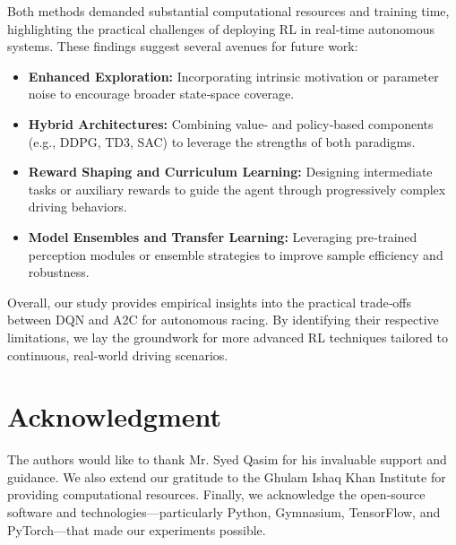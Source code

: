 \documentclass[conference]{IEEEtran}
\begin{document}
Both methods demanded substantial computational resources and training time, highlighting the practical challenges of deploying RL in real‐time autonomous systems. These findings suggest several avenues for future work:

\begin{itemize}
  \item \textbf{Enhanced Exploration:} Incorporating intrinsic motivation or parameter noise to encourage broader state‐space coverage.
  \item \textbf{Hybrid Architectures:} Combining value‐ and policy‐based components (e.g., DDPG, TD3, SAC) to leverage the strengths of both paradigms.
  \item \textbf{Reward Shaping and Curriculum Learning:} Designing intermediate tasks or auxiliary rewards to guide the agent through progressively complex driving behaviors.
  \item \textbf{Model Ensembles and Transfer Learning:} Leveraging pre‐trained perception modules or ensemble strategies to improve sample efficiency and robustness.
\end{itemize}

Overall, our study provides empirical insights into the practical trade‐offs between DQN and A2C for autonomous racing. By identifying their respective limitations, we lay the groundwork for more advanced RL techniques tailored to continuous, real‐world driving scenarios.  


\section*{Acknowledgment}

The authors would like to thank Mr. Syed Qasim for his invaluable support and guidance. We also extend our gratitude to the Ghulam Ishaq Khan Institute for providing computational resources. Finally, we acknowledge the open‐source software and technologies—particularly Python, Gymnasium, TensorFlow, and PyTorch—that made our experiments possible.
\end{document}
